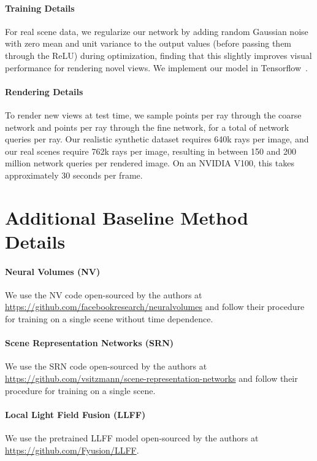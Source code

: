 \documentclass[runningheads]{llncs}
\begin{document}
\paragraph{\textbf{Training Details}}
For real scene data, we regularize our network by adding random Gaussian noise with zero mean and unit variance to the output  values (before passing them through the ReLU) during optimization, finding that this slightly improves visual performance for rendering novel views. We implement our model in Tensorflow~\cite{tensorflow}.

\paragraph{\textbf{Rendering Details}}
To render new views at test time, we sample  points per ray through the coarse network and  points per ray through the fine network, for a total of  network queries per ray. Our realistic synthetic dataset requires 640k rays per image, and our real scenes require 762k rays per image, resulting in between 150 and 200 million network queries per rendered image. On an NVIDIA V100, this takes approximately 30 seconds per frame.

\section{Additional Baseline Method Details}

\paragraph{\textbf{Neural Volumes (NV)}~\cite{neuralvolumes}}
We use the NV code open-sourced by the authors at \url{https://github.com/facebookresearch/neuralvolumes} and follow their procedure for training on a single scene without time dependence. 

\paragraph{\textbf{Scene Representation Networks (SRN)}~\cite{srn}}
We use the SRN code open-sourced by the authors at \url{https://github.com/vsitzmann/scene-representation-networks} and follow their procedure for training on a single scene.

\paragraph{\textbf{Local Light Field Fusion (LLFF)}~\cite{mildenhall19}}
We use the pretrained LLFF model open-sourced by the authors at \url{https://github.com/Fyusion/LLFF}.
\end{document}
